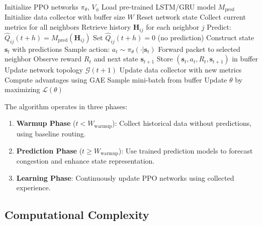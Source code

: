 \begin{algorithm}[t]
\caption{Traffic-Aware PPO Routing}
\label{alg:tappo}
\begin{algorithmic}[1]
\STATE Initialize PPO networks $\pi_\theta$, $V_\phi$
\STATE Load pre-trained LSTM/GRU model $M_{\text{pred}}$
\STATE Initialize data collector with buffer size $W$
    \STATE Reset network state
            \STATE Collect current metrics for all neighbors
                \STATE Retrieve history $\mathbf{H}_{ij}$ for each neighbor $j$
                \STATE Predict: $\hat{Q}_{ij}(t+h) = M_{\text{pred}}(\mathbf{H}_{ij})$
            \ELSE
                \STATE Set $\hat{Q}_{ij}(t+h) = 0$ (no prediction)
            \ENDIF
            \STATE Construct state $\mathbf{s}_t$ with predictions
            \STATE Sample action: $a_t \sim \pi_\theta(\cdot | \mathbf{s}_t)$
            \STATE Forward packet to selected neighbor
            \STATE Observe reward $R_t$ and next state $\mathbf{s}_{t+1}$
            \STATE Store $(\mathbf{s}_t, a_t, R_t, \mathbf{s}_{t+1})$ in buffer
        \ENDFOR
        \STATE Update network topology $\mathcal{G}(t+1)$
        \STATE Update data collector with new metrics
    \ENDFOR
        \STATE Compute advantages using GAE
            \STATE Sample mini-batch from buffer
            \STATE Update $\theta$ by maximizing $\mathcal{L}(\theta)$
        \ENDFOR
    \ENDIF
\ENDFOR
\end{algorithmic}
\end{algorithm}

The algorithm operates in three phases:

\begin{enumerate}
\item \textbf{Warmup Phase} ($t < W_{\text{warmup}}$): Collect historical data without predictions, using baseline routing.

\item \textbf{Prediction Phase} ($t \geq W_{\text{warmup}}$): Use trained prediction models to forecast congestion and enhance state representation.

\item \textbf{Learning Phase}: Continuously update PPO networks using collected experience.
\end{enumerate}

\subsection{Computational Complexity}


